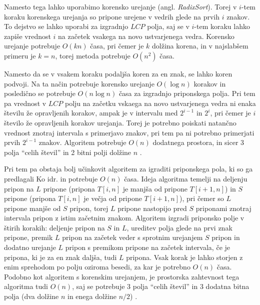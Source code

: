 Namesto tega lahko uporabimo korensko urejanje (angl. \textit{RadixSort}). Torej v $i$-tem koraku korenskega urejanja so pripone urejene v vedrih glede na prvih $i$ znakov. To dejstvo se lahko uporabi za izgradnjo $LCP$ polja, saj se v $i$-tem koraku lahko zapiše vrednost $i$ na začetek vsakega na novo ustvarjenega vedra. Korensko urejanje potrebuje $O(kn)$ časa, pri čemer je $k$ dolžina korena, in v najslabšem primeru je $k=n$, torej metoda potrebuje $O(n^2)$ časa.

Namesto da se v vsakem koraku podaljša koren za en znak, se lahko koren podvoji. Na ta način potrebuje korensko urejanje $O(\log{n})$ korakov in posledično se potrebuje $O(n\log{n})$ časa za izgradnjo priponskega polja. Pri tem pa vrednost v $LCP$ polju na začetku vskaega na novo ustvarjenega vedra ni enaka številu že opravljenih korakov, ampak je v intervalu med $2^{i-1}$ in $2^{i}$, pri čemer je $i$ število že opravljenih korakov urejanja. Torej je potrebno poiskati natančno vrednost znotraj intervala s primerjavo znakov, pri tem pa ni potrebno primerjati prvih $2^{i-1}$ znakov. Algoritem potrebuje $O(n)$ dodatnega prostora, in sicer 3 polja \enquote{celih števil} in 2 bitni polji dolžine $n$ \cite{Manber1990}.


Pri tem pa obstaja bolj učinkovit algoritem za igraditi priponskega pola, ki so ga predlagali Ko idr. \cite{Ko2005} in potrebuje $O(n)$ časa. Ideja algoritma temelji na deljenju pripon na $L$ pripone (pripona $T[i,n]$ je manjša od pripone $T[i+1,n]$) in $S$ pripone (pripona $T[i,n]$ je večja od pripone $T[i+1,n]$), pri čemer so $L$ pripone manjše od $S$ pripon, torej $L$ pripone nastopijo pred $S$ priponami znotraj intervala pripon z istim začetnim znakom. Algoritem izgradi priponsko polje v štirih korakih: deljenje pripon na $S$ in $L$, ureditev polja glede na prvi znak pripone, premik $L$ pripon na začetek veder s sprotnim urejanjem $S$ pripon in dodatno urejanje $L$ pripon s premikom pripone na začetek intervala, če je pripona, ki je za en znak daljša, tudi $L$ pripona. Vsak korak je lahko storjen z enim sprehodom po polju oziroma besedi, za kar je potrebno $O(n)$ časa. Podobno kot algoritem s korenskim urejanjem, je prostorska zahtevnost tega algoritma tudi $O(n)$, saj se potrebuje 3 polja \enquote{celih števil} in 3 dodatna bitna polja (dva dolžine $n$ in enega dolžine $n/2$) \cite{Ko2005}.